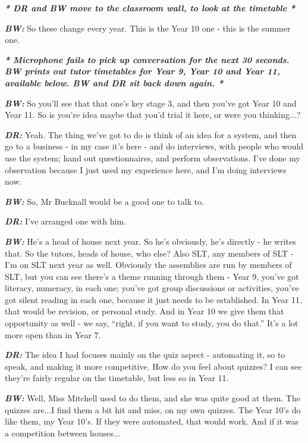 \begin{center}
\textit{\textbf{* DR and BW move to the classroom wall, to look at the timetable *}}
\end{center}

\textit{\textbf{BW:}} So these change every year. This is the Year 10 one - this is the summer one.

\begin{center}
\textit{\textbf{* Microphone fails to pick up conversation for the next 30 seconds. BW prints out tutor timetables for Year 9, Year 10 and Year 11, available below. BW and DR sit back down again. *}}\\
\end{center}

\textit{\textbf{BW:}} So you'll see that that one's key stage 3, and then you've got Year 10 and Year 11. So is you're idea maybe that you'd trial it here, or were you thinking...?

\textit{\textbf{DR:}} Yeah. The thing we've got to do is think of an idea for a system, and then go to a business - in my case it's here - and do interviews, with people who would use the system; hand out questionnaires, and perform observations. I've done my observation because I just used my experience here, and I'm doing interviews now.

\textit{\textbf{BW:}} So, Mr Bucknall would be a good one to talk to.

\textit{\textbf{DR:}} I've arranged one with him.

\textit{\textbf{BW:}} He's a head of house next year. So he's obviously, he's directly - he writes that. So the tutors, heads of house, who else? Also SLT, any members of SLT - I'm on SLT next year as well. Obviously the assemblies are run by members of SLT, but you can see there's a theme running through them - Year 9, you've got literacy, numeracy, in each one; you've got group discussions or activities, you've got silent reading in each one, because it just needs to be established. In Year 11, that would be revision, or personal study. And in Year 10 we give them that opportunity as well - we say, ``right, if you want to study, you do that.'' It's a lot more open than in Year 7.

\textit{\textbf{DR:}} The idea I had focuses mainly on the quiz aspect - automating it, so to speak, and making it more competitive. How do you feel about quizzes? I can see they're fairly regular on the timetable, but less so in Year 11.

\textit{\textbf{BW:}} Well, Miss Mitchell used to do them, and she was quite good at them. The quizzes are...I find them a bit hit and miss, on my own quizzes. The Year 10's do like them, my Year 10's. If they were automated, that would work. And if it was a competition between houses...

